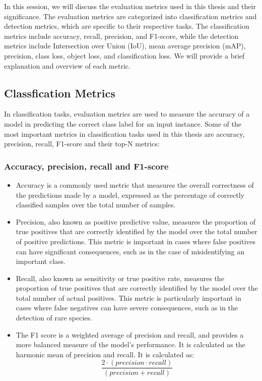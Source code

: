 In this session, we will discuss the evaluation metrics used in this thesis and their significance. The evaluation metrics are categorized into classification metrics and detection metrics, which are specific to their respective tasks. The classification metrics include accuracy, recall, precision, and F1-score, while the detection metrics include Intersection over Union (IoU), mean average precision (mAP), precision, class loss, object loss, and classification loss. We will provide a brief explanation and overview of each metric.
\subsection{Classfication Metrics}
In classification tasks, evaluation metrics are used to measure the accuracy of a model in predicting the correct class label for an input instance. Some of the most important metrics in classification tasks used in this thesis are accuracy, precision, recall, F1-score and their top-N metrics:
\subsubsection{Accuracy, precision, recall and F1-score}
\begin{itemize}
    \item Accuracy is a commonly used metric that measures the overall correctness of the predictions made by a model, expressed as the percentage of correctly classified samples over the total number of samples. 
    \item Precision, also known as positive predictive value, measures the proportion of true positives that are correctly identified by the model over the total number of positive predictions. This metric is important in cases where false positives can have significant consequences, such as in the case of misidentifying an important class.
    \item Recall, also known as sensitivity or true positive rate, measures the proportion of true positives that are correctly identified by the model over the total number of actual positives. This metric is particularly important in cases where false negatives can have severe consequences, such as in the detection of rare species.
    \item The F1 score is a weighted average of precision and recall, and provides a more balanced measure of the model's performance. It is calculated as the harmonic mean of precision and recall. It is calculated as:
    \begin{equation}
        \frac{2 \cdot (precision \cdot recall)}{(precision + recall)}
    \end{equation}
\end{itemize}

